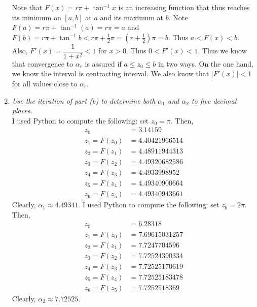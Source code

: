 \documentclass[12pt]{article}
\begin{document}
\begin{enumerate}[\it\ \ (a)\ \ ]
\noindent Note that $F(x) = r\pi + \tan^{-1}{x}$ is an increasing function that thus reaches its minimum on $[a,b]$ at $a$ and its maximum at $b$.  Note $F(a) = r\pi + \tan^{-1}(a) = r\pi = a$ and $F(b) = r\pi + \tan^{-1}{b} < r\pi + \frac{1}{2}\pi = (r + \frac{1}{2})\pi = b$.  Thus $a < F(x) < b$.  Also, $F'(x) = \dfrac{1}{1 + x^2} < 1$ for $x > 0$.  Thus $0 < F'(x) < 1$.  Thus we know that convergence to $\alpha_r$ is assured if $a \leq z_0 \leq b$ in two ways.  On the one hand, we know the interval is contracting interval.  We also know that $|F'(x)| < 1$ for all values close to $\alpha_r$.

\item {\it Use the iteration of part (b) to determine both $\alpha_1$ and $\alpha_2$ to five decimal places.}\\

\noindent I used Python to compute the following:  set $z_0 = \pi$.  Then,
\begin{align*}
z_0 &= 3.14159 \\
z_1 = F(z_0) &= 4.40421966514 \\
z_2 = F(z_1) &= 4.48911944313 \\
z_3 = F(z_2) &= 4.49320682586 \\
z_4 = F(z_3) &= 4.4933998952 \\
z_5 = F(z_4) &= 4.49340900664 \\
z_6 = F(z_5) &= 4.49340943661
\end{align*}
Clearly, $\boxed{\alpha_1 \approx 4.49341}$.  I used Python to compute the following:  set $z_0 = 2\pi$.  Then,
\begin{align*}
z_0 &= 6.28318 \\
z_1 = F(z_0) &= 7.69615031257 \\
z_2 = F(z_1) &= 7.7247704596 \\
z_3 = F(z_2) &= 7.72524390334 \\
z_4 = F(z_3) &= 7.72525170619 \\
z_5 = F(z_4) &= 7.72525183478 \\
z_6 = F(z_5) &= 7.7252518369
\end{align*}
Clearly, $\boxed{\alpha_2 \approx 7.72525}$.
\end{enumerate}
\end{document}
